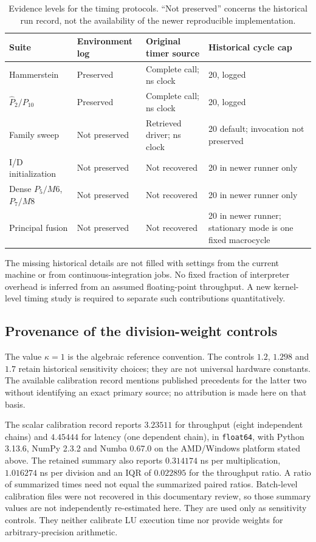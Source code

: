 \documentclass[11pt]{article}
\begin{document}
\begin{table}[htbp]\centering\small
\caption{Evidence levels for the timing protocols. ``Not preserved'' concerns the historical run record, not the availability of the newer reproducible implementation.}\label{tab:environment-evidence}
\begin{tabularx}{\textwidth}{lXXX}
\toprule
Suite & Environment log & Original timer source & Historical cycle cap\\\midrule
Hammerstein & Preserved & Complete call; ns clock & 20, logged\\
$\widehat P_2/P_{10}$ & Preserved & Complete call; ns clock & 20, logged\\
Family sweep & Not preserved & Retrieved driver; ns clock & 20 default; invocation not preserved\\
I/D initialization & Not preserved & Not recovered & 20 in newer runner only\\
Dense $P_5/M6$, $P_7/M8$ & Not preserved & Not recovered & 20 in newer runner only\\
Principal fusion & Not preserved & Not recovered & 20 in newer runner; stationary mode is one fixed macrocycle\\
\bottomrule\end{tabularx}
\end{table}

The missing historical details are not filled with settings from the current machine or from continuous-integration jobs. No fixed fraction of interpreter overhead is inferred from an assumed floating-point throughput. A new kernel-level timing study is required to separate such contributions quantitatively.

\subsection{Provenance of the division-weight controls}
The value $\kappa=1$ is the algebraic reference convention. The controls $1.2$, $1.298$ and $1.7$ retain historical sensitivity choices; they are not universal hardware constants. The available calibration record mentions published precedents for the latter two without identifying an exact primary source; no attribution is made here on that basis.

The scalar calibration record reports $3.23511$ for throughput (eight independent chains) and $4.45444$ for latency (one dependent chain), in \texttt{float64}, with Python 3.13.6, NumPy 2.3.2 and Numba 0.67.0 on the AMD/Windows platform stated above. The retained summary also reports $0.314174$ ns per multiplication, $1.016274$ ns per division and an IQR of $0.022895$ for the throughput ratio. A ratio of summarized times need not equal the summarized paired ratios. Batch-level calibration files were not recovered in this documentary review, so those summary values are not independently re-estimated here. They are used only as sensitivity controls. They neither calibrate LU execution time nor provide weights for arbitrary-precision arithmetic.
\end{document}
